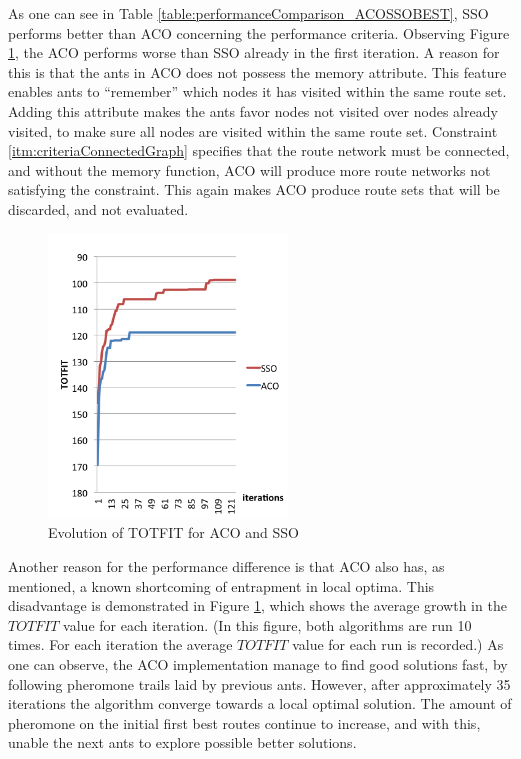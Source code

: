 As one can see in Table \vref{table:performanceComparison_ACOSSOBEST}, SSO performs better than ACO concerning the performance criteria. Observing Figure \ref{fig:acovssso}, the ACO performs worse than SSO already in the first iteration. A reason for this is that the ants in ACO does not possess the memory attribute. This feature enables ants to ``remember'' which nodes it has visited within the same route set. Adding this attribute makes the ants favor nodes not visited over nodes already visited, to make sure all nodes are visited within the same route set. Constraint \vref{itm:criteriaConnectedGraph} specifies that the route network must be connected, and without the memory function, ACO will produce more route networks not satisfying the constraint. This again makes ACO produce route sets that will be discarded, and not evaluated. %

 \begin{figure}[H]
    \begin{center}
    \includegraphics[width=2.5in]{assets/acovsssoNEW.png}
    \end{center}
    \caption{Evolution of TOTFIT for ACO and SSO }
    \label{fig:acovssso} 
\end{figure}

Another reason for the performance difference is that ACO also has, as mentioned, a known shortcoming of entrapment in local optima. This disadvantage is demonstrated in Figure \ref{fig:acovssso}, which shows the average growth in the $TOTFIT$ value for each iteration. (In this figure, both algorithms are run 10 times. For each iteration the average $TOTFIT$ value for each run is recorded.) As one can observe, the ACO implementation manage to find good solutions fast, by following pheromone trails laid by previous ants. However, after approximately 35 iterations the algorithm converge towards a local optimal solution. The amount of pheromone on the initial first best routes continue to increase, and with this, unable the next ants to explore possible better solutions. 


